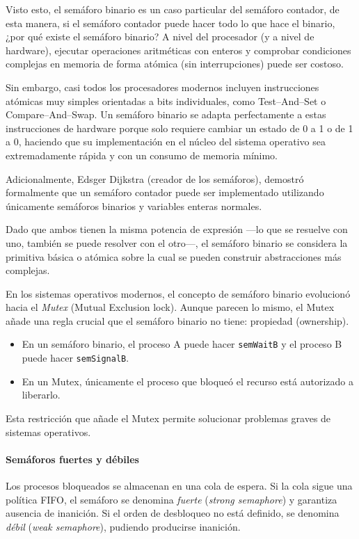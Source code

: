 Visto esto, el semáforo binario es un caso particular del semáforo contador, de esta manera, si el semáforo contador puede hacer todo lo que hace el binario, ¿por qué existe el semáforo binario? 
A nivel del procesador (y a nivel de hardware), ejecutar operaciones aritméticas con enteros y comprobar condiciones complejas en memoria de forma atómica (sin interrupciones) puede ser costoso.

Sin embargo, casi todos los procesadores modernos incluyen instrucciones atómicas muy simples orientadas a bits individuales, como Test--And--Set o Compare--And--Swap. Un semáforo binario se adapta perfectamente a estas instrucciones de hardware porque solo requiere cambiar un estado de 0 a 1 o de 1 a 0, haciendo que su implementación en el núcleo del sistema operativo sea extremadamente rápida y con un consumo de memoria mínimo.

Adicionalmente, Edsger Dijkstra (creador de los semáforos), demostró formalmente que un semáforo contador puede ser implementado utilizando únicamente semáforos binarios y variables enteras normales.

Dado que ambos tienen la misma potencia de expresión ---lo que se resuelve con uno, también se puede resolver con el otro---, el semáforo binario se considera la primitiva básica o atómica sobre la cual se pueden construir abstracciones más complejas.

En los sistemas operativos modernos, el concepto de semáforo binario evolucionó hacia el \textit{Mutex} (Mutual Exclusion lock). Aunque parecen lo mismo, el Mutex añade una regla crucial que el semáforo binario no tiene: propiedad (ownership).
\begin{itemize}
  \item En un semáforo binario, el proceso A puede hacer \texttt{semWaitB} y el proceso B puede hacer \texttt{semSignalB}.
  \item En un Mutex, únicamente el proceso que bloqueó el recurso está autorizado a liberarlo.
\end{itemize}
Esta restricción que añade el Mutex permite solucionar problemas graves de sistemas operativos.

\paragraph{Semáforos fuertes y débiles}

Los procesos bloqueados se almacenan en una cola de espera. Si la cola sigue una política FIFO, el semáforo se denomina \textit{fuerte} (\textit{strong semaphore}) y garantiza ausencia de inanición. Si el orden de desbloqueo no está definido, se denomina \textit{débil} (\textit{weak semaphore}), pudiendo producirse inanición.

